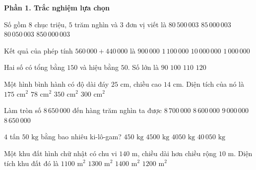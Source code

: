 \textbf{Phần 1. Trắc nghiệm lựa chọn}

\begin{ex} %
Số gồm $8$ chục triệu, $5$ trăm nghìn và $3$ đơn vị viết là
\choice
{\True $80\,500\,003$}
{$85\,000\,003$}
{$80\,050\,003$}
{$850\,000\,003$}
\end{ex}

\begin{ex} %
Kết quả của phép tính $560\,000 + 440\,000$ là
\choice
{$900\,000$}
{$1\,100\,000$}
{$10\,000\,000$}
{\True $1\,000\,000$}
\end{ex}

\begin{ex} %
Hai số có tổng bằng $150$ và hiệu bằng $50$. Số lớn là
\choice
{$90$}
{\True $100$}
{$110$}
{$120$}
\end{ex}

\begin{ex} %
Một hình bình hành có độ dài đáy $25\text{ cm}$, chiều cao $14\text{ cm}$. Diện tích của nó là
\choice
{$175\text{ cm}^2$}
{$78\text{ cm}^2$}
{\True $350\text{ cm}^2$}
{$300\text{ cm}^2$}
\end{ex}

\begin{ex} %
Làm tròn số $8\,650\,000$ đến hàng trăm nghìn ta được
\choice
{\True $8\,700\,000$}
{$8\,600\,000$}
{$9\,000\,000$}
{$8\,650\,000$}
\end{ex}

\begin{ex} %
$4$ tấn $50\text{ kg}$ bằng bao nhiêu ki-lô-gam?
\choice
{$450\text{ kg}$}
{$4500\text{ kg}$}
{\True $4050\text{ kg}$}
{$40\,050\text{ kg}$}
\end{ex}

\begin{ex} %
Một khu đất hình chữ nhật có chu vi $140\text{ m}$, chiều dài hơn chiều rộng $10\text{ m}$. Diện tích khu đất đó là
\choice
{$1100\text{ m}^2$}
{$1300\text{ m}^2$}
{$1400\text{ m}^2$}
{\True $1200\text{ m}^2$}
\end{ex}


